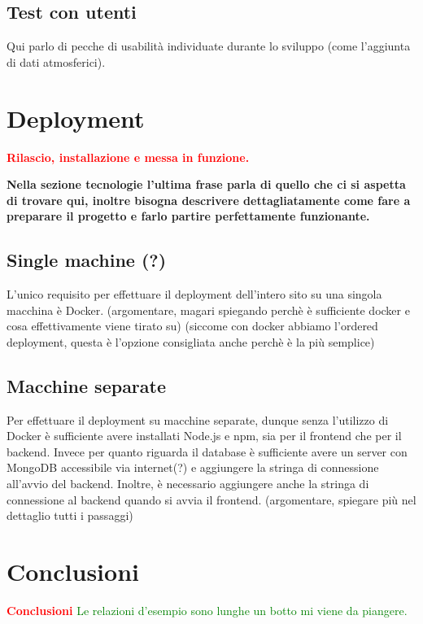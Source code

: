 \documentclass{article}
\begin{document}
\subsection{Test con utenti}
Qui parlo di pecche di usabilità individuate durante lo sviluppo (come l'aggiunta di dati atmosferici).

\section{Deployment}\label{sec:deployment}
\textcolor{red}{\textbf{Rilascio, installazione e messa in funzione.}}

\textbf{Nella sezione tecnologie l'ultima frase parla di quello che ci si aspetta di trovare qui, inoltre bisogna descrivere dettagliatamente come fare a preparare il progetto e farlo partire perfettamente funzionante.}

\subsection{Single machine (?)}
L'unico requisito per effettuare il deployment dell'intero sito su una singola macchina è Docker. (argomentare, magari spiegando perchè è sufficiente docker e cosa effettivamente viene tirato su)
(siccome con docker abbiamo l'ordered deployment, questa è l'opzione consigliata anche perchè è la più semplice)

\subsection{Macchine separate}
Per effettuare il deployment su macchine separate, dunque senza l'utilizzo di Docker è sufficiente avere installati Node.js e npm, sia per il frontend che per il backend. Invece per quanto riguarda il database è sufficiente avere un server con MongoDB accessibile via internet(?) e aggiungere la stringa di connessione all'avvio del backend. Inoltre, è necessario aggiungere anche la stringa di connessione al backend quando si avvia il frontend.
(argomentare, spiegare più nel dettaglio tutti i passaggi)

\section{Conclusioni}
\textcolor{red}{\textbf{Conclusioni}}
\textcolor{green}{Le relazioni d'esempio sono lunghe un botto mi viene da piangere.}



\end{document}
